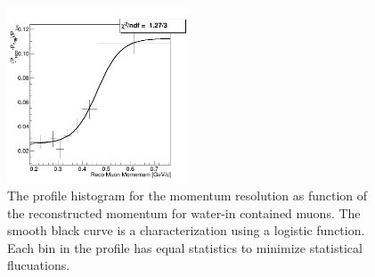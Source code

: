\begin{figure}
    \begin{centering}
        \includegraphics[width=0.48\textwidth]{Appendices/Figures/P0DCC1pi/Contained_SignalMuons_NoAnomally_UnCalib_reco_p_biasFit}
        \caption[Resolution Function for \podtitle{} Fully Contained Muon Tracks]{The profile histogram for the
	momentum resolution as function of the reconstructed momentum for \podtext{}
	water-in contained muons. The smooth black curve is a characterization using a logistic function.
    Each bin in the profile has equal statistics to minimize statistical flucuations.\label{fig:MuonContainedResolutionProfile}}
    \end{centering}
\end{figure}
